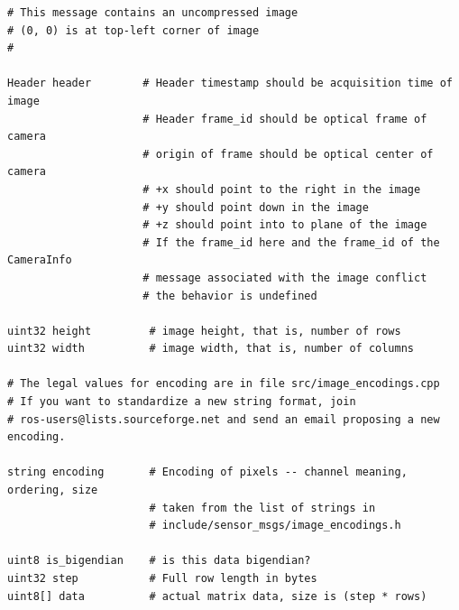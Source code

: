 \begin{lstlisting}[caption=Definizione del messaggio \emph{sensor\_msgs/Image}.]
# This message contains an uncompressed image
# (0, 0) is at top-left corner of image
#

Header header        # Header timestamp should be acquisition time of image
                     # Header frame_id should be optical frame of camera
                     # origin of frame should be optical center of camera
                     # +x should point to the right in the image
                     # +y should point down in the image
                     # +z should point into to plane of the image
                     # If the frame_id here and the frame_id of the CameraInfo
                     # message associated with the image conflict
                     # the behavior is undefined

uint32 height         # image height, that is, number of rows
uint32 width          # image width, that is, number of columns

# The legal values for encoding are in file src/image_encodings.cpp
# If you want to standardize a new string format, join
# ros-users@lists.sourceforge.net and send an email proposing a new encoding.

string encoding       # Encoding of pixels -- channel meaning, ordering, size
                      # taken from the list of strings in
                      # include/sensor_msgs/image_encodings.h

uint8 is_bigendian    # is this data bigendian?
uint32 step           # Full row length in bytes
uint8[] data          # actual matrix data, size is (step * rows)
\end{lstlisting}
\newpage

